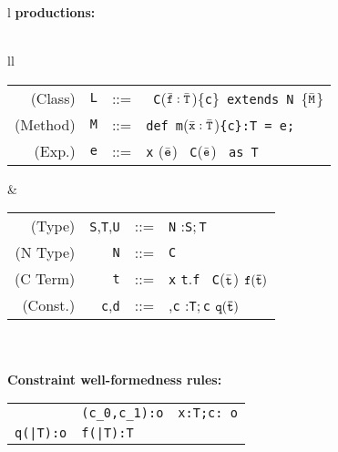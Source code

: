 
\begin{figure*}
\footnotesize
\begin{tabular}{l}
{\bf \FX{} productions:} \\
\quad\\
\begin{tabular}{ll}
\begin{tabular}{r@{\quad}r@{~~}c@{~~}l}
  (Class) & {\tt L} &{::=}& \klass\ {\tt C}($\bar{\tt f}:\bar{\tt T}$)\{{\tt c}\}\ {\tt extends}\ {\tt N}\ \{$\bar{\tt M}$\} \\
  (Method)& {\tt M} &{::=}& {\tt def}\ {\tt m}($\bar{\tt x}:\bar{\tt T}$){\tt \{c\}:T\,=\,e;}\\
  (Exp.)& {\tt e} &{::=}& {\tt x} \alt \this \alt {\tt e.f} \alt {\tt e.m}($\bar{\tt e}$) 
   \alt \new\ {\tt C}($\bar{\tt e}$) \alt {\tt e}\ \mbox{{\tt as} {\tt T}} \\ 
\end{tabular} 
&
\begin{tabular}{r@{\quad}r@{~~}c@{~~}l}
  (Type)& {\tt S},{\tt T},{\tt U}&{::=}& {\tt N}
        \alt {\tt T\{c\}} \alt {\tt x}:{\tt S};\,{\tt T}\\
  (N Type) & {\tt N}&{::=}& {\tt C} \alt {\tt N\{c\}}\\
  (C Term) & {\tt t} &{::=}& {\tt x} \alt \self \alt \this \alt
  {\tt t}.{\tt f} \alt \new\ {\tt C}($\bar{\tt t}$) \alt $\tt f(\bar{\tt t})$ \\
  (Const.) & {\tt c},{\tt d} &{::=}&\true \alt {\tt t==t} \alt {\tt c},{\tt c} \alt {\tt x}:{\tt T};\,{\tt c} \alt ${\tt q(\bar{\tt t})}$
\end{tabular} 
\end{tabular}
\quad \\
\quad\\
{\bf Constraint well-formedness rules:}\\[-12pt]
{\tabcolsep=0pt
\begin{tabular}{p{}p{}p{}}
\infax[True]{\Gamma \vdash {\tt true}: {\tt o}}
&
\infrule[And]
	{\Gamma\tt  \vdash c_0: o \andalso \Gamma \vdash c_1: o}
	{\Gamma\tt \vdash (c_0,c_1):o}
&
\infrule[Exists]
	{\Gamma\tt \vdash t: T \andalso \Gamma \vdash c[t/x]:o}
	{\Gamma\tt \vdash x:T;c: o}
\\
\infrule[Pred]
        {\tt q(\bar{\tt T}):{\tt o}\in {\cal C} \andalso \Gamma \vdash \bar{\tt t}:\bar{\tt T}}
        {\Gamma \vdash \tt q(\bar{\tt T}):o}
&
\infrule[Fun]
        {\tt f(\bar{\tt T}):{\tt T}\in {\cal C} \andalso \Gamma \vdash \bar{\tt t}:\bar{\tt T}}
        {\Gamma\tt \vdash \tt f(\bar{\tt T}):T}

\end{tabular}}
\end{tabular}
\end{figure*}
